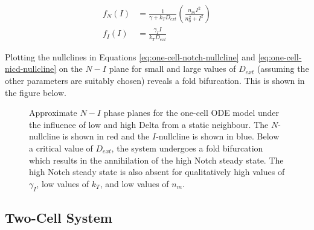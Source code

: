 \documentclass{article}
\begin{document}
\begin{flushleft}
\begin{align}
  \label{eq:one-cell-notch-nullcline}
  f_{N}(I) &= \frac{1}{\gamma + k_{T}D_{ext}}\left(\frac{n_{m}I^2}{n_{0}^2 + I^2}\right) \\[5pt]
  \label{eq:one-cell-nicd-nullcline}
  f_{I}(I) &= \frac{\gamma_{I}I}{k_{T}D_{ext}}
\end{align}

Plotting the nullclines in Equations \ref{eq:one-cell-notch-nullcline} and \ref{eq:one-cell-nicd-nullcline} on the $N-I$ plane for small and large values of $D_{ext}$ (assuming the other parameters are suitably chosen) reveals a fold bifurcation. This is shown in the figure below.

\begin{figure}[!htp]
  \label{fig:one-cell-phase-plane}
  \centering
  \caption{Approximate $N-I$ phase planes for the one-cell ODE model under the influence of low and high Delta from a static neighbour. The $N$-nullcline is shown in red and the $I$-nullcline is shown in blue. Below a critical value of $D_{ext}$, the system undergoes a fold bifurcation which results in the annihilation of the high Notch steady state. The high Notch steady state is also absent for qualitatively high values of $\gamma_{I}$, low values of $k_{T}$, and low values of $n_{m}$.}
\end{figure}

\subsection*{Two-Cell System}


\end{flushleft}
\end{document}

